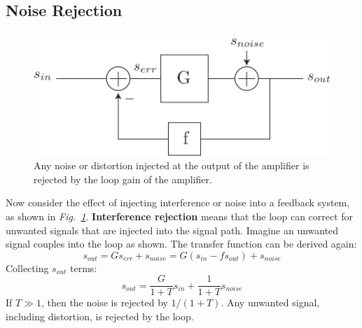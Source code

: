 \subsection{Noise Rejection}
\begin{figure}[tb]
\centering
\includegraphics[scale=.7]{fbblock_noise}
\caption{Any noise or distortion injected at the output of the amplifier is rejected by the loop gain of the amplifier.}
\label{fig:fbblock_noise}
\end{figure}
Now consider the effect of injecting interference or noise into a feedback system, as shown in \emph{Fig.~\ref{fig:fbblock_noise}}. \textbf{Interference rejection} means that the loop can correct for unwanted signals that are injected into the signal path.  Imagine an unwanted signal couples into the loop as shown.  The transfer function can be derived again:
    \begin{equation}
        {s_{out}} = G{s_{err}} + {s_{noise}} = G({s_{in}} - f{s_{out}}) + {s_{noise}}
    \end{equation}
Collecting $s_{out}$ terms:
    \begin{equation}
        {s_{out}} = \frac{G}{{1 + T}}{s_{in}} + \frac{1}{{1 + T}}{s_{noise}}
    \end{equation}
If $T \gg 1$, then the noise is rejected by $1/(1+T)$. Any unwanted signal, including distortion, is rejected by the loop.
